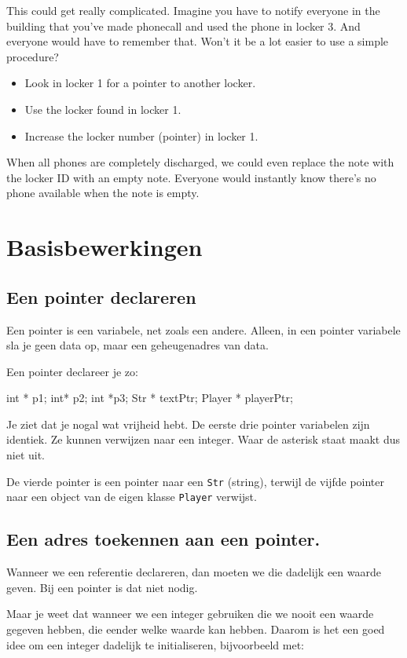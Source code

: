 This could get really complicated. Imagine you have to notify everyone in the building that you've made phonecall and used the phone in locker 3. And everyone would have to remember that. Won't it be a lot easier to use a simple procedure?

\begin{itemize}
  \item Look in locker 1 for a pointer to another locker.
  \item Use the locker found in locker 1.
  \item Increase the locker number (pointer) in locker 1.
\end{itemize}

When all phones are completely discharged, we could even replace the note with the locker ID with an empty note. Everyone would instantly know there's no phone available when the note is empty.

\section{Basisbewerkingen}
\subsection{Een pointer declareren}
Een pointer is een variabele, net zoals een andere. Alleen, in een pointer variabele sla je geen data op, maar een geheugenadres van data. 

Een pointer declareer je zo:

\begin{code}
int * p1;
int* p2;
int *p3;
Str * textPtr;
Player * playerPtr;
\end{code}

Je ziet dat je nogal wat vrijheid hebt. De eerste drie pointer variabelen zijn identiek. Ze kunnen verwijzen naar een integer. Waar de asterisk staat maakt dus niet uit.

De vierde pointer is een pointer naar een \texttt{Str} (string), terwijl de vijfde pointer naar een object van de eigen klasse \texttt{Player} verwijst.

\subsection{Een adres toekennen aan een pointer.}
Wanneer we een referentie declareren, dan moeten we die dadelijk een waarde geven. Bij een pointer is dat niet nodig.

Maar je weet dat wanneer we een integer gebruiken die we nooit een waarde gegeven hebben, die eender welke waarde kan hebben. Daarom is het een goed idee om een integer dadelijk te initialiseren, bijvoorbeeld met:

